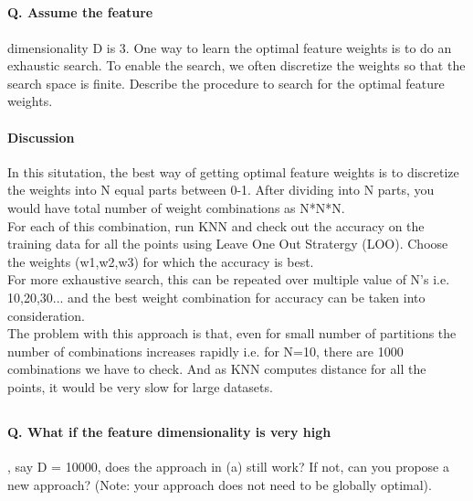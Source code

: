 \documentclass[paper=a4, fontsize=11pt]{scrartcl} %
\numberwithin{equation}{section} %
\numberwithin{figure}{section} %
\numberwithin{table}{section} %
\begin{document}
\subsection{}
\paragraph{Q. Assume the feature}
dimensionality D is 3. One way to learn the optimal feature weights is to do an exhaustic search. To enable the search, we often discretize the weights so that the search space is finite. Describe the procedure to search for the optimal feature weights.

\paragraph{Discussion}
In this situtation, the best way of getting optimal feature weights is to discretize the weights into N equal parts between 0-1. After dividing into N parts, you would have total number of weight combinations as N*N*N.\\

For each of this combination, run KNN and check out the accuracy on the training data for all the points using Leave One Out Stratergy (LOO). Choose the weights (w1,w2,w3) for which the accuracy is best.\\

For more exhaustive search, this can be repeated over multiple value of N's i.e. 10,20,30... and the best weight combination for accuracy can be taken into consideration.\\

The problem with this approach is that, even for small number of partitions the number of combinations increases rapidly i.e. for N=10, there are 1000 combinations we have to check. And as KNN computes distance for all the points, it would be very slow for large datasets.

\subsection{}
\paragraph{Q. What if the feature dimensionality is very high}, say D = 10000, does the approach in (a) still work? If not, can you propose a new approach? (Note: your approach does not need to be globally optimal).
\end{document}
